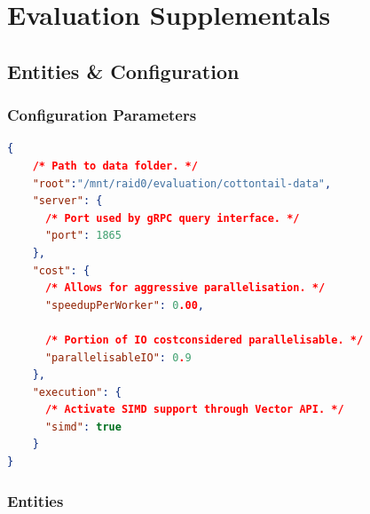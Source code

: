 \chapter{Evaluation Supplementals}
\label{chapter:appendix_results}


\section*{\cottontail{} Entities \& Configuration}

\subsection*{Configuration Parameters}

\begin{lstlisting}[language=json, caption={Cottontail DB configuration used during evaluation (config.json).}, label=listing:cottontail_config, numbers=none]
{
    /* Path to data folder. */
    "root":"/mnt/raid0/evaluation/cottontail-data",
    "server": {
      /* Port used by gRPC query interface. */
      "port": 1865
    },
    "cost": {
      /* Allows for aggressive parallelisation. */
      "speedupPerWorker": 0.00,  

      /* Portion of IO costconsidered parallelisable. */
      "parallelisableIO": 0.9
    },
    "execution": {
      /* Activate SIMD support through Vector API. */
      "simd": true
    }
} 
\end{lstlisting}

\subsection*{Entities}

